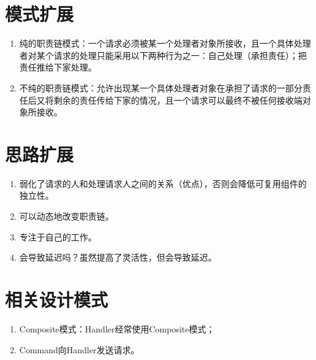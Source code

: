 \section{模式扩展}
\begin{enumerate}
	\item 纯的职责链模式：一个请求必须被某一个处理者对象所接收，且一个具体处理者对某个请求的处理只能采用以下两种行为之一：自己处理（承担责任）；把责任推给下家处理。
	\item 不纯的职责链模式：允许出现某一个具体处理者对象在承担了请求的一部分责任后又将剩余的责任传给下家的情况，且一个请求可以最终不被任何接收端对象所接收。
\end{enumerate}
\section{思路扩展}
\begin{enumerate}
	\item 弱化了请求的人和处理请求人之间的关系（优点），否则会降低可复用组件的独立性。
	\item 可以动态地改变职责链。
	\item 专注于自己的工作。
	\item 会导致延迟吗？虽然提高了灵活性，但会导致延迟。
\end{enumerate}
\section{相关设计模式}
\begin{enumerate}
	\item Composite模式：Handler经常使用Composite模式；
	\item Command向Handler发送请求。
\end{enumerate}